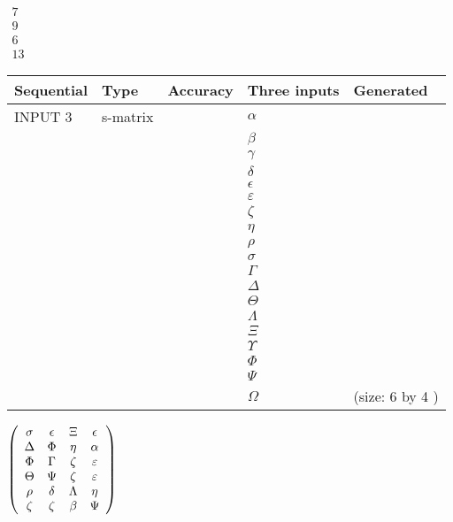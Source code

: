 \documentclass[12pt]{article}
\begin{document}
   
 $\begin{array}{
 c
 }
           7  \\ 
           9  \\ 
           6  \\ 
          13
\end{array}  $ 
  
  
\noindent\begin{tabular}{|l|l|l|l|l|}
\hline
 Sequential & Type & Accuracy & Three inputs & Generated \\ 
\hline
 
 
  INPUT $            3 $ & s-matrix & & 
 $  \alpha $ & 
  \\
  & & & 
 $  \beta $ & 
  \\
  & & & 
 $  \gamma $ & 
  \\
  & & & 
 $  \delta $ & 
  \\
  & & & 
 $  \epsilon $ & 
  \\
  & & & 
 $  \varepsilon $ & 
  \\
  & & & 
 $                     \zeta $ & 
  \\
  & & & 
 $  \eta $ & 
  \\
  & & & 
 $  \rho $ & 
  \\
  & & & 
 $  \sigma $ & 
  \\
  & & & 
 $  \Gamma $ & 
  \\
  & & & 
 $  \Delta $ & 
  \\
  & & & 
 $  \Theta $ & 
  \\
  & & & 
 $  \Lambda $ & 
  \\
  & & & 
 $                     \Xi $ & 
  \\
  & & & 
 $  \Upsilon $ & 
  \\
  & & & 
 $  \Phi $ & 
  \\
  & & & 
 $  \Psi $ & 
  \\
  & & & 
 $  \Omega $ & 
  (size:            6  by            4 )
 \\  \hline  
 \end{tabular}
   
   
 $  \left( \begin{array}
 {
 c
 c
 c
 c
 }
 \sigma & 
 \epsilon & 
                    \Xi & 
 \epsilon \\ 
 \Delta & 
 \Phi & 
 \eta & 
 \alpha \\ 
 \Phi & 
 \Gamma & 
                    \zeta & 
 \varepsilon \\ 
 \Theta & 
 \Psi & 
                    \zeta & 
 \varepsilon \\ 
 \rho & 
 \delta & 
 \Lambda & 
 \eta \\ 
                    \zeta & 
                    \zeta & 
 \beta & 
 \Psi
 \end{array} \right) $ 
  
\end{document}
